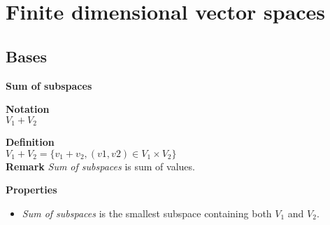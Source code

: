 \documentclass{article}
\begin{document}
\newpage

\section{Finite dimensional vector spaces}

\subsection{Bases}

\begin{framed}

    \textbf{Sum of subspaces}

    \begin{framed}
        \textbf{Notation}\\
        $V_{1}+V_{2}$
    \end{framed}

    \begin{framed}
        \textbf{Definition}\\
        $V_{1}+V_{2}=\{v_{1}+v_{2},(v1,v2)\in V_{1}\times V_{2}\}$\\
        \textbf{Remark} \textit{Sum of subspaces} is sum of values.
    \end{framed}

    \begin{framed}
        \textbf{Properties}
        \begin{itemize}
            \item \textit{Sum of subspaces} is the smallest subspace containing both $V_{1}$ and $V_{2}$.
        \end{itemize}
    \end{framed}

\end{framed}

\newpage
\end{document}
